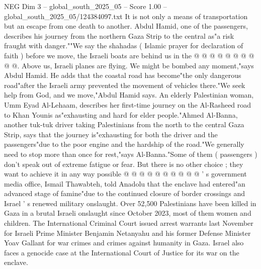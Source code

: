 \begin{textsample}{NEG Dim 3 – global\_south\_2025\_05 – Score 1.00 – global\_south\_2025\_05/124384097.txt}
It is not only a means of transportation but an escape from one death to another.
Abdul Hamid, one of the passengers, describes his journey from the northern Gaza Strip to the central as"a risk fraught with danger.""We say the shahadas ( Islamic prayer for declaration of faith ) before we move, the Israeli boats are behind us in the @ @ @ @ @ @ @ @ @ @.
Above us, Israeli planes are flying.
We might be bombed any moment,"says Abdul Hamid.
He adds that the coastal road has become"the only dangerous road"after the Israeli army prevented the movement of vehicles there."We seek help from God, and we move,"Abdul Hamid says.
An elderly Palestinian woman, Umm Eyad Al-Lehaam, describes her first-time journey on the Al-Rasheed road to Khan Younis as"exhausting and hard for elder people."Ahmed Al-Banna, another tuk-tuk driver taking Palestinians from the north to the central Gaza Strip, says that the journey is"exhausting for both the driver and the passengers"due to the poor engine and the hardship of the road."We generally need to stop more than once for rest,"says Al-Banna."Some of them ( passengers ) don't speak out of extreme fatigue or fear.
But there is no other choice ; they want to achieve it in any way possible @ @ @ @ @ @ @ @ @ @ ' s government media office, Ismail Thawabteh, told Anadolu that the enclave had entered"an advanced stage of famine"due to the continued closure of border crossings and Israel ' s renewed military onslaught.
Over 52,500 Palestinians have been killed in Gaza in a brutal Israeli onslaught since October 2023, most of them women and children.
The International Criminal Court issued arrest warrants last November for Israeli Prime Minister Benjamin Netanyahu and his former Defense Minister Yoav Gallant for war crimes and crimes against humanity in Gaza.
Israel also faces a genocide case at the International Court of Justice for its war on the enclave.

\end{textsample}
